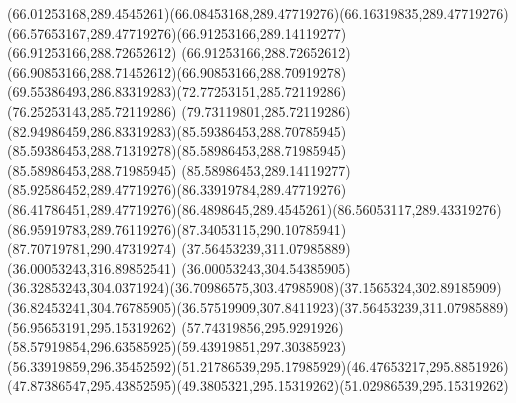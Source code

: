 {{\curveto(66.01253168,289.4545261)(66.08453168,289.47719276)(66.16319835,289.47719276)
\curveto(66.57653167,289.47719276)(66.91253166,289.14119277)(66.91253166,288.72652612)
\curveto(66.91253166,288.72652612)(66.90853166,288.71452612)(66.90853166,288.70919278)
\curveto(69.55386493,286.83319283)(72.77253151,285.72119286)(76.25253143,285.72119286)
\curveto(79.73119801,285.72119286)(82.94986459,286.83319283)(85.59386453,288.70785945)
\curveto(85.59386453,288.71319278)(85.58986453,288.71985945)(85.58986453,288.71985945)
\curveto(85.58986453,289.14119277)(85.92586452,289.47719276)(86.33919784,289.47719276)
\curveto(86.41786451,289.47719276)(86.4898645,289.4545261)(86.56053117,289.43319276)
\curveto(86.95919783,289.76119276)(87.34053115,290.10785941)(87.70719781,290.47319274)
\moveto(37.56453239,311.07985889)
\lineto(36.00053243,316.89852541)
\lineto(36.00053243,304.54385905)
\curveto(36.32853243,304.0371924)(36.70986575,303.47985908)(37.1565324,302.89185909)
\curveto(36.82453241,304.76785905)(36.57519909,307.8411923)(37.56453239,311.07985889)
\moveto(56.95653191,295.15319262)
\curveto(57.74319856,295.9291926)(58.57919854,296.63585925)(59.43919851,297.30385923)
\curveto(56.33919859,296.35452592)(51.21786539,295.17985929)(46.47653217,295.8851926)
\curveto(47.87386547,295.43852595)(49.3805321,295.15319262)(51.02986539,295.15319262)
\closepath
}
}

{
}

